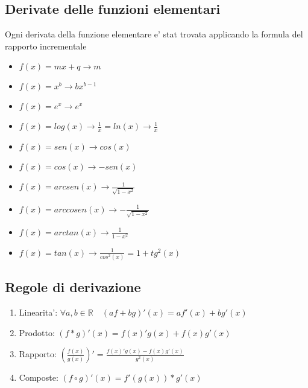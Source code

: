 \documentclass{article}
\begin{document}
        \subsection{Derivate delle funzioni elementari}
        \begin{flushleft}
          Ogni derivata della funzione elementare e' stat trovata applicando la formula del rapporto incrementale
          \begin{itemize}
            \item $f(x)=mx+q \to m$
            \item $f(x)=x^b \to bx^{b-1}$
            \item $f(x)=e^x \to e^x$
            \item $f(x)=log(x) \to \frac{1}{x} = ln(x) \to \frac{1}{x}$
            \item $f(x)=sen(x) \to cos(x)$
            \item $f(x)=cos(x) \to -sen(x)$
            \item $f(x)=arcsen(x) \to \frac{1}{\sqrt{1-x^2}}$
            \item $f(x)=arccosen(x) \to -\frac{1}{\sqrt{1-x^2}}$
            \item $f(x)=arctan(x) \to \frac{1}{1-x^2}$
            \item $f(x)=tan(x) \to \frac{1}{cos^2(x)}=1+tg^2(x)$
          \end{itemize}
        \end{flushleft}
        \subsection{Regole di derivazione}
        \begin{flushleft}
         \begin{enumerate}
          \item Linearita': $\forall a,b \in \mathbb{R} \quad (af+bg)'(x)=af'(x)+bg'(x)$ 
          \item Prodotto: $(f*g)'(x)=f(x)'g(x)+f(x)g'(x)$ 
          \item Rapporto: $(\frac{f(x)}{g(x)})'=\frac{f(x)'g(x)-f(x)g'(x)}{g^2(x)}$ 
          \item Composte: $(f\circ g)'(x)=f'(g(x))*g'(x)$ 
         \end{enumerate}
        \end{flushleft}
\end{document}
